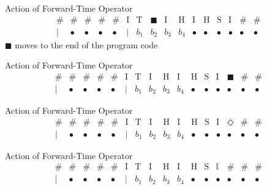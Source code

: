 \documentclass[slideColor]{prosper}
\renewcommand{\>}{\rangle}
\newcommand{\<}{\langle}
\newcommand{\I}{\mathrm{I}}
\renewcommand{\H}{\mathrm{H}}
\renewcommand{\S}{\mathrm{S}}
\newcommand{\T}{\mathrm{T}}
\newcommand{\bI}{\mathbb{I}}
\begin{document}

\begin{slide}{Action of Forward-Time Operator}
\[
\begin{array}{cccccccccccccccccc}
\#   &\#      &\#      &\#      &\#      &\I      & \T  & \blacksquare  & \I  &\H      &\I      &\H      &\S      &\I  &\#     &\#  \\
\mid &\bullet &\bullet &\bullet &\bullet &\mid    & b_1 & b_2 & b_3 & b_4    &\bullet &\bullet &\bullet &\bullet &\bullet &\bullet
\end{array}\,
\]
$\blacksquare$ moves to the end of the program code
\end{slide}


\begin{slide}{Action of Forward-Time Operator}
\[
\begin{array}{cccccccccccccccccc}
\#   &\#      &\#      &\#      &\#      &\I      & \T  & \I  &\H      &\I      &\H      &\S      &\I   &\blacksquare &\#     &\#  \\
\mid &\bullet &\bullet &\bullet &\bullet &\mid    & b_1 & b_2 & b_3 & b_4    &\bullet &\bullet &\bullet &\bullet &\bullet &\bullet
\end{array}\,
\]
\end{slide}


\begin{slide}{Action of Forward-Time Operator}
\[
\begin{array}{cccccccccccccccccc}
\#   &\#      &\#      &\#      &\#      &\I      & \T  & \I  &\H      &\I      &\H      &\S      &\I   &\Diamond &\#     &\#  \\
\mid &\bullet &\bullet &\bullet &\bullet &\mid    & b_1 & b_2 & b_3 & b_4    &\bullet &\bullet &\bullet &\bullet &\bullet &\bullet
\end{array}\,
\]
\end{slide}


\begin{slide}{Action of Forward-Time Operator}
\[
\begin{array}{cccccccccccccccccc}
\#   &\#      &\#      &\#      &\#      &\I      & \T  & \I  &\H      &\I      &\H      &\S      &\bI   &\# &\#     &\#  \\
\mid &\bullet &\bullet &\bullet &\bullet &\mid    & b_1 & b_2 & b_3 & b_4    &\bullet &\bullet &\bullet &\bullet &\bullet &\bullet
\end{array}\,
\]
\end{slide}
\end{document}

